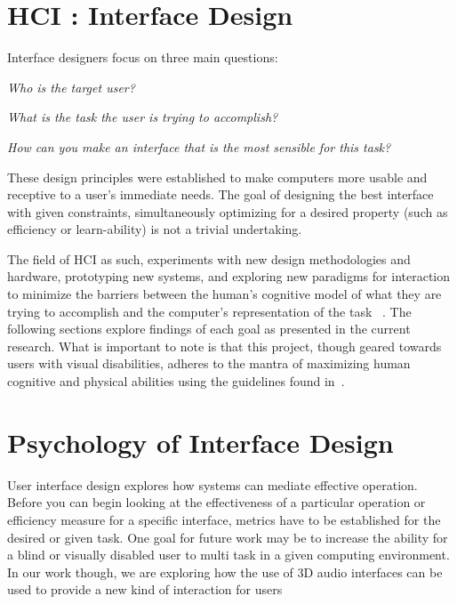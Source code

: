 \section{                 HCI : Interface Design                             }

Interface designers focus on three main questions:

\textit{Who is the target user?}

\textit{What is the task the user is trying to accomplish?}

\textit{How can you make an interface that is the most sensible for this task?}

These design principles were established to make computers more usable and
receptive to a user's immediate needs. The goal of designing the best interface
with given constraints, simultaneously optimizing for a desired property (such
as efficiency or learn-ability) is not a trivial undertaking.

The field of HCI as such, experiments with new design methodologies and
hardware, prototyping new systems, and exploring new paradigms for interaction
to minimize the  barriers between the human's cognitive model of what they are
trying to accomplish and the computer's representation of the task
~\cite{baecker1987human}. The following sections explore findings of each goal
as presented in the current research.  What is important to note is that this
project, though geared towards users with visual disabilities, adheres to
the mantra of maximizing human cognitive and physical abilities using the
guidelines found in~\cite{reeves2004guidelines}.

\section{                  Psychology of Interface Design                    }

User interface design explores how systems can mediate effective operation.
Before you can begin looking at the effectiveness of a particular operation or
efficiency measure for a specific interface, metrics have to be established for
the desired or given task. One goal for future work may be to increase the
ability for a blind or visually disabled user to multi task in a given computing
environment.  In our work though, we are exploring how the use of 3D audio
interfaces can be used to provide a new kind of interaction for users

